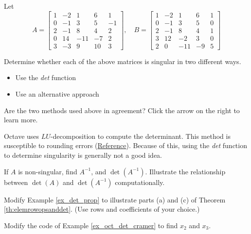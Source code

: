\documentclass{ximera}
\begin{document}
\begin{problem}\label{prob_oct_det1}
  Let 
  $$A=\begin{bmatrix}1 &-2 & 1 & 6 & 1\\0 & -1 & 3 & 5 & -1\\2 & -1 & 8 & 4 & 2\\0 & 14 & -11 & -7 & 2\\3 & -3 & 9 & 10 & 3\end{bmatrix},\quad B=\begin{bmatrix}1 &-2 & 1 & 6 &1\\0 & -1 & 3 & 5 & 0\\2 & -1 & 8 & 4 & 1\\3 & 12 & -2 & 3 & 0\\2 & 0 & -11 & -9 & 5\end{bmatrix}$$

Determine whether each of the above matrices is singular in two different ways. 
\begin{itemize}
\item Use the \emph{det} function
\item Use an alternative approach
\end{itemize}  
Are the two methods used above in agreement?  Click the arrow on the right to learn more.

\begin{expandable}
Octave uses $LU$-decomposition to compute the determinant.  This method is susceptible to rounding errors (\href{https://www.mathworks.com/help/matlab/ref/det.html}{Reference}).  Because of this, using the \emph{det} function to determine singularity is generally not a good idea.
\end{expandable}

If $A$ is non-singular, find $A^{-1}$, and $\det(A^{-1})$.  Illustrate the relationship between $\det(A)$ and $\det(A^{-1})$ computationally.
  \end{problem}

  \begin{problem}\label{prob_oct_det_prop}
    Modify Example \ref{ex_det_prop} to illustrate parts (a) and (c) of Theorem \ref{th:elemrowopsanddet}.  (Use rows and coefficients of your choice.)
  \end{problem}

  \begin{problem}\label{prob_oct_det_cramer}
    Modify the code of Example \ref{ex_oct_det_cramer} to find $x_2$ and $x_3$.  
  \end{problem}
\end{document}

